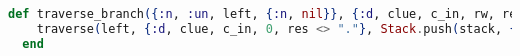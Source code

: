 \begin{lstlisting}[language=Elixir, caption=Example of how a branch is traversed]
def traverse_branch({:n, :un, left, {:n, nil}}, {:d, clue, c_in, rw, res}, stack) do
    traverse(left, {:d, clue, c_in, 0, res <> "."}, Stack.push(stack, {:st_el, {:n, :b, {:n, nil}, {:n, nil}}, rw, res}))
  end
\end{lstlisting}